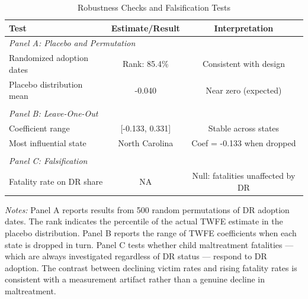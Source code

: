 \begin{table}[htbp]
\centering
\begin{threeparttable}
\caption{Robustness Checks and Falsification Tests}
\label{tab:robustness}
\small
\begin{tabular}{lcc}
\toprule
Test & Estimate/Result & Interpretation \\
\midrule
\multicolumn{3}{l}{\textit{Panel A: Placebo and Permutation}} \\[3pt]
Randomized adoption dates & Rank: 85.4\% & Consistent with design \\
Placebo distribution mean & -0.040 & Near zero (expected) \\
\\
\multicolumn{3}{l}{\textit{Panel B: Leave-One-Out}} \\[3pt]
Coefficient range & [-0.133, 0.331] & Stable across states \\
Most influential state & North Carolina & Coef = -0.133 when dropped \\
\\
\multicolumn{3}{l}{\textit{Panel C: Falsification}} \\[3pt]
Fatality rate on DR share & NA & Null: fatalities unaffected by DR \\
\bottomrule
\end{tabular}
\begin{tablenotes}
\item \textit{Notes:} Panel A reports results from 500 random permutations of DR adoption dates. The rank indicates the percentile of the actual TWFE estimate in the placebo distribution. Panel B reports the range of TWFE coefficients when each state is dropped in turn. Panel C tests whether child maltreatment fatalities --- which are always investigated regardless of DR status --- respond to DR adoption. The contrast between declining victim rates and rising fatality rates is consistent with a measurement artifact rather than a genuine decline in maltreatment.
\end{tablenotes}
\end{threeparttable}
\end{table}
